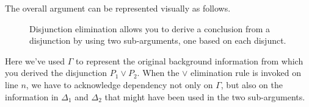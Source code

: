 The overall argument can be represented visually as follows.
\begin{figure}[h]
\caption{Disjunction elimination allows you to derive a conclusion
  from a disjunction by using two sub-arguments, one based on each disjunct.}
                                  \label{dilemma}
\end{figure}
Here we've used $\Gamma$ to represent the original background
information from which you derived the disjunction $P_1\vee P_2$.
When the $\vee$ elimination rule is invoked on line $n$, we have to
acknowledge dependency not only on $\Gamma$, but also on the
information in $\Delta _1$ and $\Delta _2$ that might have been used
in the two sub-arguments.


